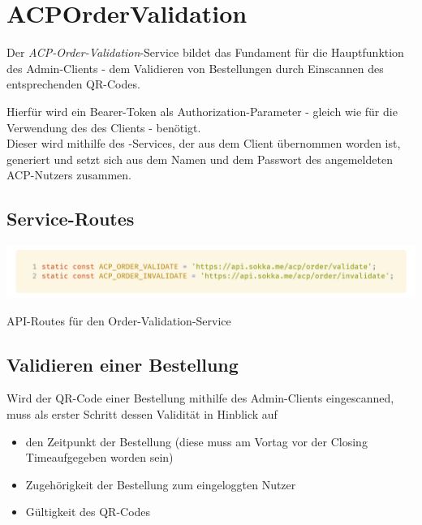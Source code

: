 \section{ACPOrderValidation}

Der \textit{ACP-Order-Validation}-Service bildet das Fundament für die Hauptfunktion des Admin-Clients -
dem Validieren von Bestellungen durch Einscannen des entsprechenden QR-Codes.

Hierfür wird ein Bearer-Token als Authorization-Parameter - gleich wie für die Verwendung des 
 des Clients - benötigt.\\
Dieser wird mithilfe des -Services, der aus dem Client übernommen worden ist,
generiert und setzt sich aus dem Namen und dem Passwort des angemeldeten ACP-Nutzers zusammen.

\subsection{Service-Routes}

\begin{code}[H]
    \centering
    \includegraphics[width=1\textwidth]{images/Admin-Client/services/acpordervalidation/routes.png}
    \vspace{-25pt}
    \caption{API-Routes für den Order-Validation-Service}
\end{code}

\subsection{Validieren einer Bestellung}

Wird der QR-Code einer Bestellung mithilfe des Admin-Clients eingescanned, muss als erster Schritt dessen
Validität in Hinblick auf 

\begin{itemize}
    \item den Zeitpunkt der Bestellung (diese muss am Vortag vor der \glqq Closing Time\grqq\space aufgegeben worden sein)
    \item Zugehörigkeit der Bestellung zum eingeloggten Nutzer
    \item Gültigkeit des QR-Codes
\end{itemize}

